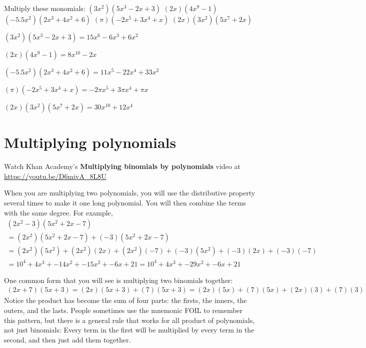 \begin{Exercise}[title={Multiplying a monomial and a polynomial}, label=multmonopoly]
Multiply these monomials:
\Question $(3x^2)(5x^3 - 2x + 3)$
\vspace{20mm}
\Question $(2x)(4x^9 - 1)$
\vspace{20mm}
\Question $(-5.5x^2)(2x^3 + 4x^2 + 6)$
\vspace{20mm}
\Question $(\pi)(-2x^5 + 3x^4 + x)$
\vspace{20mm}
\Question $(2x)(3x^2)(5x^7 + 2x)$
\end{Exercise}
\begin{Answer}[ref=multmonopoly]
  $(3x^2)(5x^3 - 2x + 3) = 15x^6 - 6x^3 + 6x^2$

  $(2x)(4x^9 - 1) = 8x^{10} - 2x$

  $(-5.5x^2)(2x^3 + 4x^2 + 6) = 11x^5 - 22x^4 + 33x^2$

  $(\pi)(-2x^5 + 3x^4 + x) = -2\pi x^5 + 3\pi x^4 + \pi x$

  $(2x)(3x^2)(5x^7 + 2x) = 30x^{10} + 12x^4$
\end{Answer}

\section{Multiplying polynomials}

Watch Khan Academy's \textbf{Multiplying binomials by polynomials} video at \url{https://youtu.be/D6mivA_8L8U}

When you are multiplying two polynomials, you will use the
distributive property several times to make it one long
polynomial. You will then combine the terms with the same degree. For
example,
\begin{multline*}
  (2x^2 - 3)(5x^2 + 2x - 7) \\
  =   (2x^2)(5x^2 + 2x - 7) + (-3)(5x^2 + 2x - 7) \\
  =   (2x^2)(5x^2) + (2x^2)(2x) + (2x^2)(-7) + (-3)(5x^2) + (-3)(2x) + (-3)(-7) \\
  =   10^4 + 4x^3 + -14x^2 + -15x^2 + -6x + 21
  =   10^4 + 4x^3 + -29x^2 + -6x + 21
\end{multline*}

One common form that you will see is multiplying two binomials together:
\begin{multline*}
(2x + 7)(5x + 3) = (2x)(5x + 3) + (7)(5x+3) = (2x)(5x) + (7)(5x) + (2x)(3) + (7)(3)
\end{multline*}
Notice the product has become the sum of four parts: the firsts, the
inners, the outers, and the lasts. People sometimes use the mnemonic
FOIL to remember this pattern, but there is a general rule that works
for all product of polynomials, not just binomials: Every
term in the first will be multiplied by every term in the second, and
then just add them together.

